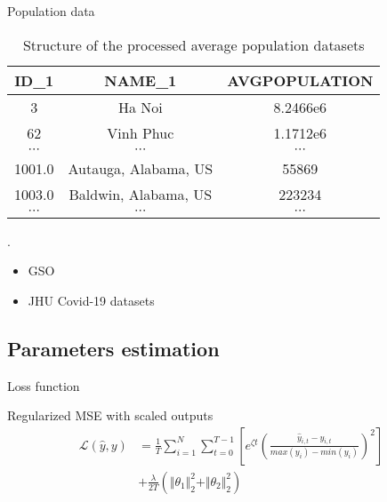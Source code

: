 \begin{frame}{Population data}
    \begin{table}[h]
    \centering
    \begin{tabular}{| c | c | c |}
        ID\_1 & NAME\_1 & AVGPOPULATION \\
        \hline\hline
        3 & Ha Noi & 8.2466e6 \\
        \hline
        62 & Vinh Phuc & 1.1712e6 \\
        \hline
        $\cdots$ & $\cdots$ & $\cdots$ \\
        \hline
        1001.0 & Autauga, Alabama, US & 55869 \\
        \hline
        1003.0 & Baldwin, Alabama, US & 223234 \\
        \hline
        $\cdots$ & $\cdots$ & $\cdots$ \\
    \end{tabular}
    \caption{Structure of the processed average population datasets}.
    \label{tab:country-subdivision-population}
    \end{table}

    \begin{itemize}
        \item \gls{GSO}
        \item \gls{JHU} Covid-19 datasets
    \end{itemize}
\end{frame}

\subsection{Parameters estimation}

\begin{frame}{Loss function}
    \begin{block}{Regularized \gls{MSE} with scaled outputs}
        \begin{equation*}
            \begin{aligned}
            \mathcal{L}(\hat{y}, y)
            &= \frac{1}{T} \sum_{i=1}^N \sum_{t=0}^{T-1} \left[ e^{\zeta t} \left(\frac{\hat{y}_{i,t} - y_{i,t}}{max(y_i) - min(y_i)}\right)^2\right]\\
            &+ \frac{\lambda}{2T} (\Vert\theta_1\Vert^2_2 + \Vert\theta_2\Vert^2_2)
            \end{aligned}
            \label{eq:ude-model-loss}
        \end{equation*}
    \end{block}
\end{frame}

